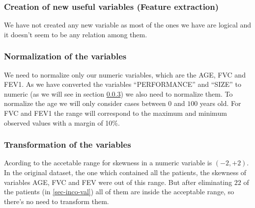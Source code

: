\subsubsection{Creation of new useful variables (Feature extraction)}

We have not created any new variable as most of the ones we have are logical and it doesn't seem to be any relation among them.


\subsubsection{Normalization of the variables}
We need to normalize only our numeric variables, which are the AGE, FVC and FEV1. As we have converted the variables ``PERFORMANCE'' and ``SIZE'' to numeric (as we will see in section \ref{sec-var-trans}) we also need to normalize them.
To normalize the age we will only consider cases between $0$ and $100$ years old.
For FVC and FEV1 the range will correspond to the maximum and minimum observed values with a margin of 10\%.









\subsubsection{Transformation of the variables} \label{sec-var-trans}
Acording to  the accetable range for skewness in a numeric
variable is $(-2, +2)$. In the original dataset, the one which contained all the patients, the skewness of variables AGE, FVC and FEV were out of this range. But after eliminating $22$ of the patients (in \ref{sec-inco-val}) all of them are inside the acceptable range, so there's no need to transform them.

